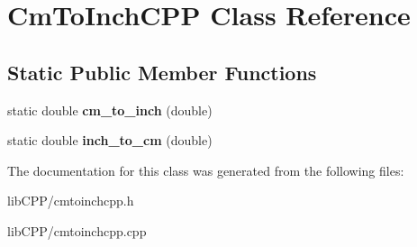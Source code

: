 \hypertarget{classCmToInchCPP}{\section{Cm\-To\-Inch\-C\-P\-P Class Reference}
\label{classCmToInchCPP}
}
\subsection*{Static Public Member Functions}
\begin{DoxyCompactItemize}
\item 
\hypertarget{classCmToInchCPP_a137509f38ad44e68e457afb92155cc94}{static double {\bfseries cm\-\_\-to\-\_\-inch} (double)}\label{classCmToInchCPP_a137509f38ad44e68e457afb92155cc94}

\item 
\hypertarget{classCmToInchCPP_a953aacbf7e8c3a63012db518555135ec}{static double {\bfseries inch\-\_\-to\-\_\-cm} (double)}\label{classCmToInchCPP_a953aacbf7e8c3a63012db518555135ec}

\end{DoxyCompactItemize}


The documentation for this class was generated from the following files\-:\begin{DoxyCompactItemize}
\item 
lib\-C\-P\-P/cmtoinchcpp.\-h\item 
lib\-C\-P\-P/cmtoinchcpp.\-cpp\end{DoxyCompactItemize}
